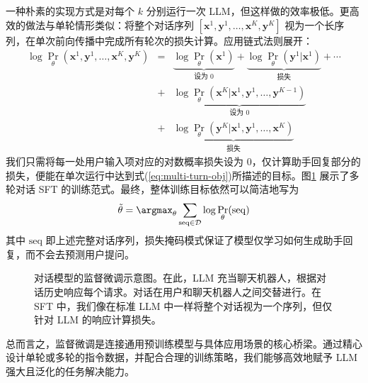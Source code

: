 一种朴素的实现方式是对每个 $k$ 分别运行一次 LLM，但这样做的效率极低。更高效的做法与单轮情形类似：将整个对话序列 $[\mathbf{x}^1,\mathbf{y}^1,\dots,\mathbf{x}^K,\mathbf{y}^K]$ 视为一个长序列，在单次前向传播中完成所有轮次的损失计算。应用链式法则展开：
\begin{eqnarray}
\log \Pr_{\theta}(\mathbf{x}^1,\mathbf{y}^1,\dots,\mathbf{x}^K,\mathbf{y}^K) &=& \underbrace{\log \Pr_{\theta}(\mathbf{x}^1)}_{\text{设为 }0} + \underbrace{\log \Pr_{\theta}(\mathbf{y}^1|\mathbf{x}^1)}_{\text{损失}} + \cdots \nonumber \\
&+& \underbrace{\log \Pr_{\theta}(\mathbf{x}^K|\mathbf{x}^1,\mathbf{y}^1,\dots,\mathbf{y}^{K-1})}_{\text{设为 }0} \nonumber \\
&+& \underbrace{\log \Pr_{\theta}(\mathbf{y}^K|\mathbf{x}^1,\mathbf{y}^1,\dots,\mathbf{x}^K)}_{\text{损失}}
\label{eq:multi-turn-chain}
\end{eqnarray}
我们只需将每一处用户输入项对应的对数概率损失设为 $0$，仅计算助手回复部分的损失，便能在单次运行中达到式(\ref{eq:multi-turn-obj})所描述的目标。图\ref{fig:sft-conversational-models} 展示了多轮对话 SFT 的训练范式。最终，整体训练目标依然可以简洁地写为
\begin{eqnarray}
\tilde{\theta} = \argmax_{\theta} \sum_{\mathrm{seq} \in \mathcal{D}} \log \Pr_{\theta}(\mathrm{seq})
\end{eqnarray}
其中 $\mathrm{seq}$ 即上述完整对话序列，损失掩码模式保证了模型仅学习如何生成助手回复，而不会去预测用户提问。

\begin{figure}[!t]
\centering

\caption{对话模型的监督微调示意图。在此，LLM 充当聊天机器人，根据对话历史响应每个请求。对话在用户和聊天机器人之间交替进行。在 SFT 中，我们像在标准 LLM 中一样将整个对话视为一个序列，但仅针对 LLM 的响应计算损失。}
\label{fig:sft-conversational-models}
\end{figure}

\vspace{0.5em}
\noindent 总而言之，监督微调是连接通用预训练模型与具体应用场景的核心桥梁。通过精心设计单轮或多轮的指令数据，并配合合理的训练策略，我们能够高效地赋予 LLM 强大且泛化的任务解决能力。
